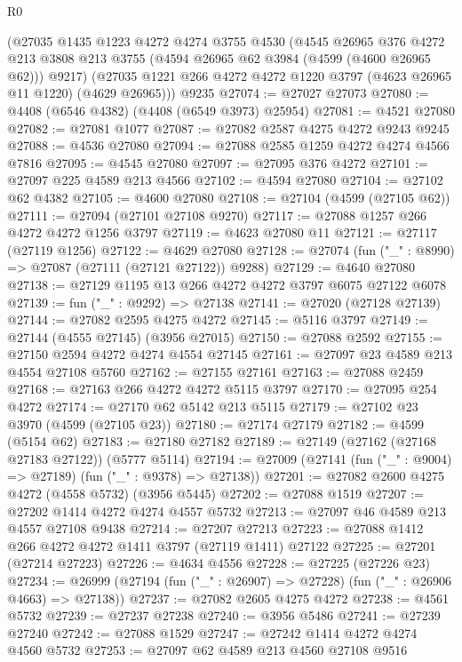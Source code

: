 \begin{lexlean}{R0}
\begin{coremodule}
    (@27035
      @1435
      @1223
      @4272
      @4274
      @3755
      @4530
      (@4545
        @26965
        @376
        @4272
        @213
        @3808
        @213
        @3755
        (@4594 @26965 @62 @3984 (@4599 (@4600 @26965 @62)))
        @9217)
      (@27035 @1221 @266 @4272 @4272 @1220 @3797 (@4623 @26965 @11 @1220) (@4629 @26965)))
    @9235
@27074 := @27027 @27073
@27080 := @4408 (@6546 @4382) (@4408 (@6549 @3973) @25954)
@27081 := @4521 @27080
@27082 := @27081 @1077
@27087 := @27082 @2587 @4275 @4272 @9243 @9245
@27088 := @4536 @27080
@27094 := @27088 @2585 @1259 @4272 @4274 @4566 @7816
@27095 := @4545 @27080
@27097 := @27095 @376 @4272
@27101 := @27097 @225 @4589 @213 @4566
@27102 := @4594 @27080
@27104 := @27102 @62 @4382
@27105 := @4600 @27080
@27108 := @27104 (@4599 (@27105 @62))
@27111 := @27094 (@27101 @27108 @9270)
@27117 := @27088 @1257 @266 @4272 @4272 @1256 @3797
@27119 := @4623 @27080 @11
@27121 := @27117 (@27119 @1256)
@27122 := @4629 @27080
@27128 := @27074 (fun ("_" : @8990) => @27087 (@27111 (@27121 @27122)) @9288)
@27129 := @4640 @27080
@27138 := @27129 @1195 @13 @266 @4272 @4272 @3797 @6075 @27122 @6078
@27139 := fun ("_" : @9292) => @27138
@27141 := @27020 (@27128 @27139)
@27144 := @27082 @2595 @4275 @4272
@27145 := @5116 @3797
@27149 := @27144 (@4555 @27145) (@3956 @27015)
@27150 := @27088 @2592
@27155 := @27150 @2594 @4272 @4274 @4554 @27145
@27161 := @27097 @23 @4589 @213 @4554 @27108 @5760
@27162 := @27155 @27161
@27163 := @27088 @2459
@27168 := @27163 @266 @4272 @4272 @5115 @3797
@27170 := @27095 @254 @4272
@27174 := @27170 @62 @5142 @213 @5115
@27179 := @27102 @23 @3970 (@4599 (@27105 @23))
@27180 := @27174 @27179
@27182 := @4599 (@5154 @62)
@27183 := @27180 @27182
@27189 := @27149 (@27162 (@27168 @27183 @27122)) (@5777 @5114)
@27194 := @27009 (@27141 (fun ("_" : @9004) => @27189) (fun ("_" : @9378) => @27138))
@27201 := @27082 @2600 @4275 @4272 (@4558 @5732) (@3956 @5445)
@27202 := @27088 @1519
@27207 := @27202 @1414 @4272 @4274 @4557 @5732
@27213 := @27097 @46 @4589 @213 @4557 @27108 @9438
@27214 := @27207 @27213
@27223 := @27088 @1412 @266 @4272 @4272 @1411 @3797 (@27119 @1411) @27122
@27225 := @27201 (@27214 @27223)
@27226 := @4634 @4556
@27228 := @27225 (@27226 @23)
@27234 := @26999 (@27194 (fun ("_" : @26907) => @27228) (fun ("_" : @26906 @4663) => @27138))
@27237 := @27082 @2605 @4275 @4272
@27238 := @4561 @5732
@27239 := @27237 @27238
@27240 := @3956 @5486
@27241 := @27239 @27240
@27242 := @27088 @1529
@27247 := @27242 @1414 @4272 @4274 @4560 @5732
@27253 := @27097 @62 @4589 @213 @4560 @27108 @9516

\end{coremodule}
\end{lexlean}
